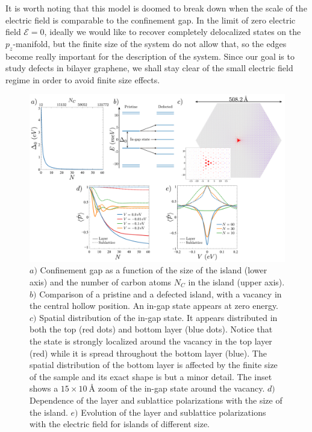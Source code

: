It is worth noting that this model is doomed to break down when the scale of the electric field is comparable to the confinement gap. In the limit of zero electric field $\mathcal{E}=0$, ideally we would like to recover completely delocalized states on the $p_z$-manifold, but the finite size of the system do not allow that, so the edges become really important for the description of the system.
Since our goal is to study defects in bilayer graphene, we shall stay clear of the small electric field regime in order to avoid finite size effects.
\begin{figure}[!ht!]
\centering
\includegraphics[width=\textwidth]{artlat/fig/confinement.pdf}
\vspace{-20pt}
\caption{$a)$ Confinement gap as a function of the size of the island (lower axis) and the number of carbon atoms $N_C$ in the island (upper axis). $b)$ Comparison of a pristine and a defected island, with a vacancy in the central hollow position. An in-gap state appears at zero energy. $c)$ Spatial distribution of the in-gap state. It appears distributed in both the top (red dots) and bottom layer (blue dots). Notice that the state is strongly localized around the vacancy in the top layer (red) while it is spread throughout the bottom layer (blue). The spatial distribution of the bottom layer is affected by the finite size of the sample and its exact shape is but a minor detail. The inset shows a $15\times\SI{10}{\angstrom}$ zoom of the in-gap state around the vacancy. $d)$ Dependence of the layer and sublattice polarizations with the size of the island. $e)$ Evolution of the layer and sublattice polarizations with the electric field for islands of different size.}
\label{confinement}
\end{figure}


